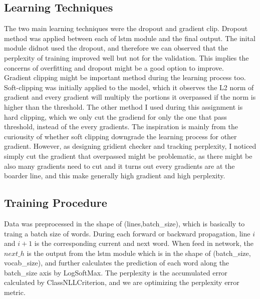 \documentclass{article}
\begin{document}
\subsection{Learning Techniques}
The two main learning techniques were the dropout and gradient clip. Dropout method was applied between each of lstm module and the final output. The inital module didnot used the dropout, and therefore we can observed that the perplexity of training improved well but not for the validation. This implies the concerns of overfitting and dropout might be a good option to improve.\\
Gradient clipping might be important method during the learning process too. Soft-clipping was initially applied to the model, which it observes the L2 norm of gradient and every gradient will multiply the portions it overpassed if the norm is higher than the threshold. The other method I used during this assignment is hard clipping, which we only cut the gradiend for only the one that pass threshold, instead of the every gradients. The inspiration is mainly from the curiousity of whether soft clipping downgrade the learning process for other gradient. However, as designing gridient checker and tracking perplexity, I noticed simply cut the gradient that overpassed might be problematic, as there might be also many gradients need to cut and it turns out every gradients are at the boarder line, and this make generally high gradient and high perplexity.

\subsection{Training Procedure}
Data was preprocessed in the shape of (lines,batch\_size), which is basically to traing a batch size of words. During each forward or backward propagation, line $i$ and $i+1$ is the corresponding current and next word. When feed in network, the $next\_h$ is the output from the lstm module which is in the shape of (batch\_size, vocab\_size), and further calculates the prediction of each word along the batch\_size axis by LogSoftMax. The perplexity is the accumulated error calculated by ClassNLLCriterion, and we are optimizing the perplexity error metric.
\end{document}
